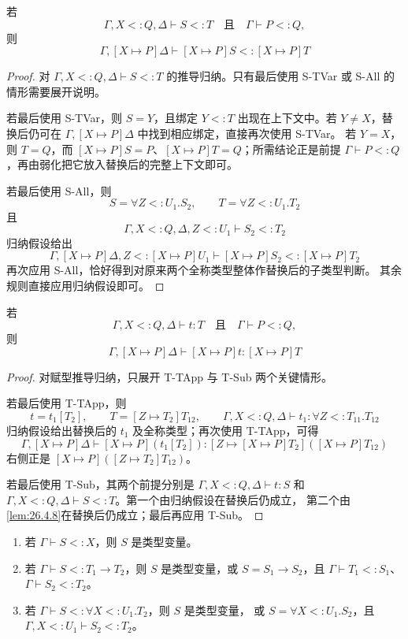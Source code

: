 \begin{lemma}[类型替换保持子类型]
\label{lem:26.4.8}
若
\[
\Gamma,X<:Q,\Delta\vdash S<:T
\quad\text{且}\quad
\Gamma\vdash P<:Q,
\]
则
\[
\Gamma,[X\mapsto P]\Delta
\vdash[X\mapsto P]S<:[X\mapsto P]T
\]
\end{lemma}

\begin{proof}
对
\(\Gamma,X<:Q,\Delta\vdash S<:T\) 的推导归纳。只有最后使用 S-TVar
或 S-All 的情形需要展开说明。

若最后使用 S-TVar，则 \(S=Y\)，且绑定 \(Y<:T\) 出现在上下文中。若
\(Y\neq X\)，替换后仍可在
\(\Gamma,[X\mapsto P]\Delta\) 中找到相应绑定，直接再次使用 S-TVar。
若 \(Y=X\)，则 \(T=Q\)，而
\([X\mapsto P]S=P\)、\([X\mapsto P]T=Q\)；所需结论正是前提
\(\Gamma\vdash P<:Q\)，再由弱化把它放入替换后的完整上下文即可。

若最后使用 S-All，则
\[
S=\forall Z<:U_1.S_2,\qquad
T=\forall Z<:U_1.T_2
\]
且
\[
\Gamma,X<:Q,\Delta,Z<:U_1\vdash S_2<:T_2
\]
归纳假设给出
\[
\Gamma,[X\mapsto P]\Delta,
Z<:[X\mapsto P]U_1
\vdash[X\mapsto P]S_2<:[X\mapsto P]T_2
\]
再次应用 S-All，恰好得到对原来两个全称类型整体作替换后的子类型判断。
其余规则直接应用归纳假设即可。
\end{proof}

\begin{lemma}[类型替换保持赋型]
\label{lem:26.4.9}
若
\[
\Gamma,X<:Q,\Delta\vdash t:T
\quad\text{且}\quad
\Gamma\vdash P<:Q,
\]
则
\[
\Gamma,[X\mapsto P]\Delta
\vdash[X\mapsto P]t:[X\mapsto P]T
\]
\end{lemma}

\begin{proof}
对赋型推导归纳，只展开 T-TApp 与 T-Sub 两个关键情形。

若最后使用 T-TApp，则
\[
t=t_1[T_2],\qquad
T=[Z\mapsto T_2]T_{12},\qquad
\Gamma,X<:Q,\Delta\vdash
t_1:\forall Z<:T_{11}.T_{12}
\]
归纳假设给出替换后的 \(t_1\) 及全称类型；再次使用 T-TApp，可得
\[
\Gamma,[X\mapsto P]\Delta\vdash
[X\mapsto P](t_1[T_2]):
[Z\mapsto[X\mapsto P]T_2]([X\mapsto P]T_{12})
\]
右侧正是 \([X\mapsto P]([Z\mapsto T_2]T_{12})\)。

若最后使用 T-Sub，其两个前提分别是
\(\Gamma,X<:Q,\Delta\vdash t:S\) 和
\(\Gamma,X<:Q,\Delta\vdash S<:T\)。第一个由归纳假设在替换后仍成立，
第二个由\cref{lem:26.4.8}在替换后仍成立；最后再应用 T-Sub。
\end{proof}

\taplstatementliststart
\begin{lemma}[从右向左反演子类型关系]
\label{lem:26.4.10}
\taplstatementlistbreak
\begin{enumerate}
  \item 若 \(\Gamma\vdash S<:X\)，则 \(S\) 是类型变量。
  \item 若 \(\Gamma\vdash S<:T_1\to T_2\)，则 \(S\) 是类型变量，或
        \(S=S_1\to S_2\)，且
        \(\Gamma\vdash T_1<:S_1\)、\(\Gamma\vdash S_2<:T_2\)。
  \item 若
        \(\Gamma\vdash S<:\forall X<:U_1.T_2\)，则 \(S\) 是类型变量，
        或 \(S=\forall X<:U_1.S_2\)，且
        \(\Gamma,X<:U_1\vdash S_2<:T_2\)。
\end{enumerate}
\end{lemma}

